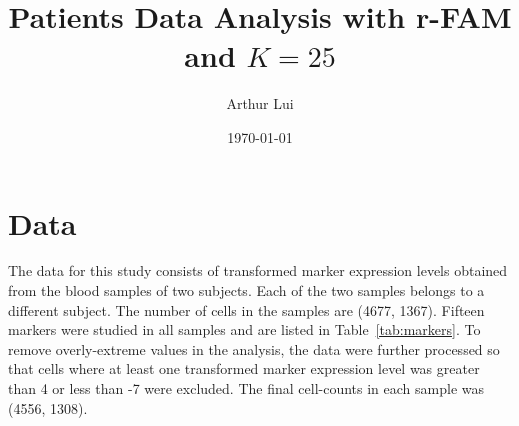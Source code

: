 \documentclass[11pt]{article} %
\title{Patients Data Analysis with r-FAM and $K=25$}
\author{Arthur Lui}
\date{\today} %
\begin{document}
\maketitle



\section{Data}\label{sec:data}
The data for this study consists of transformed marker expression levels
obtained from the blood samples of two subjects. Each of the two samples
belongs to a different subject. The number of cells in the samples are (4677,
1367). Fifteen markers were studied in all samples and are listed
in Table~\ref{tab:markers}. To remove overly-extreme values in the analysis,
the data were further processed so that cells where at least one transformed
marker expression level was greater than 4 or less than -7 were excluded. The
final cell-counts in each sample was (4556, 1308).

\end{document}
